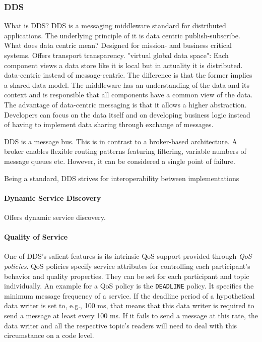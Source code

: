 \subsubsection{DDS}
What is DDS?
DDS is a messaging middleware standard for distributed applications. 
The underlying principle of it is data centric publish-subscribe.
What does data centric mean?
Designed for mission- and business critical systems.
Offers transport transparency.
"virtual global data space": Each component views a data store like it is local but in actuality it is distributed.
data-centric instead of message-centric. The difference is that the former implies a shared data model. The middleware has an understanding of the data and its context and is responsible that all components have a common view of the data.
The advantage of data-centric messaging is that it allows a higher abstraction. Developers can focus on the data itself and on developing business logic instead of having to implement data sharing through exchange of messages.

DDS is a message bus. This is in contrast to a broker-based architecture. A broker enables flexible routing patterns featuring filtering, variable numbers of message queues etc. However, it can be considered a single point of failure.

Being a standard, DDS strives for interoperability between implementations

\paragraph{Dynamic Service Discovery}
Offers dynamic service discovery.


\paragraph{Quality of Service}
One of DDS's salient features is its intrinsic QoS support provided through \emph{QoS policies}.
QoS policies specify service attributes for controlling each participant's behavior and quality properties. They can be set for each participant and topic individually. An example for a QoS policy is the \texttt{DEADLINE} policy. It specifies the minimum message frequency of a service. If the deadline period of a hypothetical data writer is set to, e.g., 100 ms, that means that this data writer is required to send a message at least every 100 ms. If it fails to send a message at this rate, the data writer and all the respective topic's readers will need to deal with this circumstance on a code level. 


